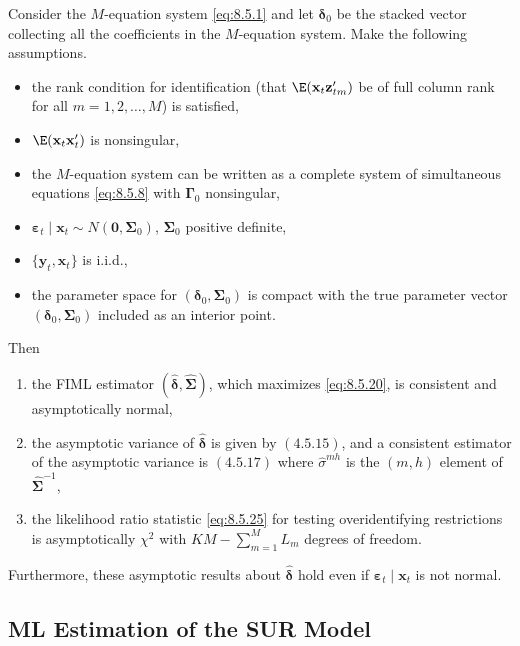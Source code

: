 \begin{proposition}\label{prop:8.1}
Consider the $M$-equation system \eqref{eq:8.5.1} and let $\boldsymbol{\delta}_0$ be the stacked vector collecting all the coefficients in the
$M$-equation system. Make the following assumptions.
\begin{itemize}
\item the rank condition for identification (that $\E(\mathbf{x}_t\mathbf{z}_{tm}')$ be of full column rank for all
  $m = 1, 2, \ldots, M$) is satisfied,
\item $\E(\mathbf{x}_t\mathbf{x}_t')$ is nonsingular,
\item the $M$-equation system can be written as a complete system of simultaneous
  equations \eqref{eq:8.5.8} with $\boldsymbol{\Gamma}_0$ nonsingular,
\item $\boldsymbol{\varepsilon}_t \mid \mathbf{x}_t \sim N(\mathbf{0}, \boldsymbol{\Sigma}_0)$,
  $\boldsymbol{\Sigma}_0$ positive definite,
\item $\{\mathbf{y}_t, \mathbf{x}_t\}$ is i.i.d.,
\item the parameter space for $(\boldsymbol{\delta}_0, \boldsymbol{\Sigma}_0)$ is compact with the true parameter vector
  $(\boldsymbol{\delta}_0, \boldsymbol{\Sigma}_0)$ included as an interior point.
\end{itemize}
Then
\begin{enumerate}[label=(\alph*)]
\item the FIML estimator $(\hat{\boldsymbol{\delta}}, \hat{\boldsymbol{\Sigma}})$, which maximizes \eqref{eq:8.5.20}, is consistent and asymptotically normal,
\item the asymptotic variance of $\hat{\boldsymbol{\delta}}$ is given by $(4.5.15)$, and a consistent estimator of
  the asymptotic variance is $(4.5.17)$ where $\hat{\sigma}^{mh}$ is the $(m, h)$ element of
  $\hat{\boldsymbol{\Sigma}}^{-1}$,
\item the likelihood ratio statistic \eqref{eq:8.5.25} for testing overidentifying restrictions is
  asymptotically $\chi^2$ with $KM - \sum_{m=1}^{M} L_m$ degrees of freedom.
\end{enumerate}
Furthermore, these asymptotic results about $\hat{\boldsymbol{\delta}}$ hold even if
$\boldsymbol{\varepsilon}_t \mid \mathbf{x}_t$ is not normal.
\end{proposition}

\subsection*{ML Estimation of the SUR Model}

